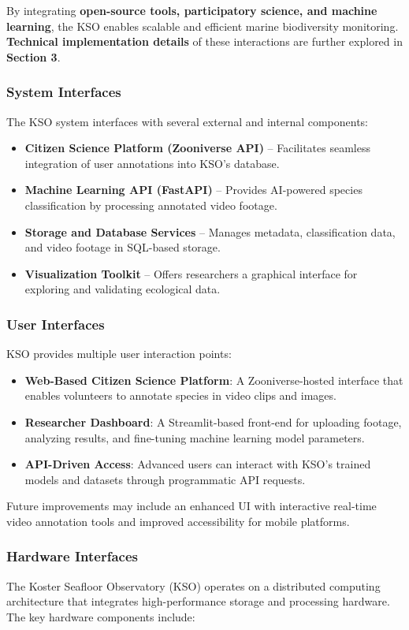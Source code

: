 By integrating \textbf{open-source tools, participatory science, and machine learning}, the KSO enables scalable and efficient marine biodiversity monitoring. \textbf{Technical implementation details} of these interactions are further explored in \textbf{Section 3}.

\subsubsection{System Interfaces}
The KSO system interfaces with several external and internal components:
\begin{itemize}
    \item \textbf{Citizen Science Platform (Zooniverse API)} – Facilitates seamless integration of user annotations into KSO's database.
    \item \textbf{Machine Learning API (FastAPI)} – Provides AI-powered species classification by processing annotated video footage.
    \item \textbf{Storage and Database Services} – Manages metadata, classification data, and video footage in SQL-based storage.
    \item \textbf{Visualization Toolkit} – Offers researchers a graphical interface for exploring and validating ecological data.
\end{itemize}

\subsubsection{User Interfaces}
KSO provides multiple user interaction points:
\begin{itemize}
    \item \textbf{Web-Based Citizen Science Platform}: A Zooniverse-hosted interface that enables volunteers to annotate species in video clips and images.
    \item \textbf{Researcher Dashboard}: A Streamlit-based front-end for uploading footage, analyzing results, and fine-tuning machine learning model parameters.
    \item \textbf{API-Driven Access}: Advanced users can interact with KSO’s trained models and datasets through programmatic API requests.
\end{itemize}

Future improvements may include an enhanced UI with interactive real-time video annotation tools and improved accessibility for mobile platforms.

\subsubsection{Hardware Interfaces}
The Koster Seafloor Observatory (KSO) operates on a distributed computing architecture that integrates high-performance storage and processing hardware. The key hardware components include:


